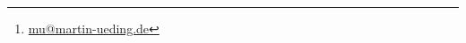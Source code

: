 

\hypersetup{
	pdftitle=
}

\title{}
\author{
	Martin Ueding \footnote{\href{mailto:mu@martin-ueding.de}{mu@martin-ueding.de}}
}



\maketitle


\IfFileExists{\bibliographyfile}{
    \printbibliography
}{}



